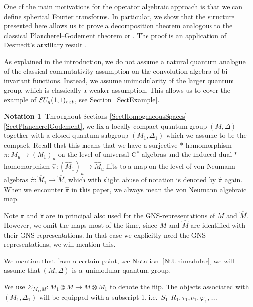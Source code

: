 \documentclass[11pt]{article}
\numberwithin{equation}{section}
\theoremstyle{definition}
\newtheorem{nt}[thm]{Notation}
\begin{document}
One of the main motivations for the operator algebraic approach is that we can def\/ine sphe\-ri\-cal Fourier transforms. In particular, we show that  the structure   presented here allows us to prove a decomposition theorem analogous to the classical Plancherel--Godement theorem  \cite[Th\'eor\`eme~IV.2]{Far} or \cite[Section~6]{Dij}. The proof is an application of Desmedt's auxiliary result \cite[Theorem~3.4.5]{Des}.

As explained in the introduction, we do not assume a natural quantum analogue of the classical commutativity assumption on the convolution algebra of bi-invariant functions. Instead, we assume unimodularity of the larger quantum group, which is classically a weaker assumption. This allows us to cover the example of $SU_q(1,1)_{\rm ext}$, see Section~\ref{SectExample}.


\begin{nt}
Throughout Sections \ref{SectHomogeneousSpaces}--\ref{SectPlancherelGodement}, we f\/ix a locally compact quantum group $(M, \Delta)$ together with a closed quantum subgroup $(M_1,\Delta_1)$ which we assume to be the compact. Recall \cite[Def\/inition~2.9]{VaeVaiLow} that this means that we have a surjective $\ast$-homomorphism $\pi: M_u \rightarrow (M_1)_u$ on the level of universal C$^\ast$-algebras and the induced dual $\ast$-homomorphism $\hat{\pi}: (\hat{M}_1)_u \rightarrow \hat{M}_u$ lifts to a map on the level of von Neumann algebras $\hat{\pi}: \hat{M}_1 \rightarrow \hat{M}$, which with slight abuse of notation is denoted by $\hat{\pi}$ again. When we encounter $\hat{\pi}$ in this paper, we always mean the von Neumann algebraic map.

Note $\pi$ and $\hat{\pi}$ are in principal also used for the GNS-representations of $M$ and $\hat{M}$. However, we omit the maps most of the time, since $M$ and $\hat{M}$ are identif\/ied with their GNS-representations. In that case we explicitly need the GNS-representations, we will mention this.

 We mention that from a certain point, see Notation~\ref{NtUnimodular}, we will assume that $(M, \Delta)$ is a~unimodular quantum group.

We use $\Sigma_{M_1, M}: M_1 \otimes M \rightarrow M \otimes M_1$ to denote the f\/lip. The objects associated with $(M_1, \Delta_1)$ will be equipped with a subscript 1, i.e.\ $S_1, R_1, \tau_1, \nu_1, \varphi_1, \ldots$.
\end{nt}
\end{document}
